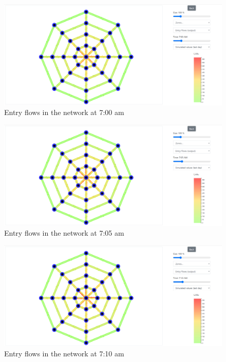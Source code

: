 \documentclass[a4paper, 12pt,oneside]{article}
\begin{document}
\begin{minipage}[c]{0.5\textwidth}
\begin{figure}[H]
    \centering
    \includegraphics[width=1\textwidth]{Images/Step2/results_on_network_700am.png}
    \caption{Entry flows in the network at 7:00 am}
    \label{fig:Entry flows in the network at 7:00 am}
\end{figure}
\end{minipage}
\begin{minipage}[c]{0.5\textwidth}
\begin{figure}[H]
    \centering
    \includegraphics[width=1\textwidth]{Images/Step2/results_on_network_705am.png}
    \caption{Entry flows in the network at 7:05 am}
    \label{fig:Entry flows in the network at 7:05 am}
\end{figure}
\end{minipage}
\begin{minipage}[c]{0.5\textwidth}
\begin{figure}[H]
    \centering
    \includegraphics[width=1\textwidth]{Images/Step2/results_on_network_710am.png}
    \caption{Entry flows in the network at 7:10 am}
    \label{fig:Entry flows in the network at 7:10 am}
\end{figure}
\end{minipage}
\end{document}
